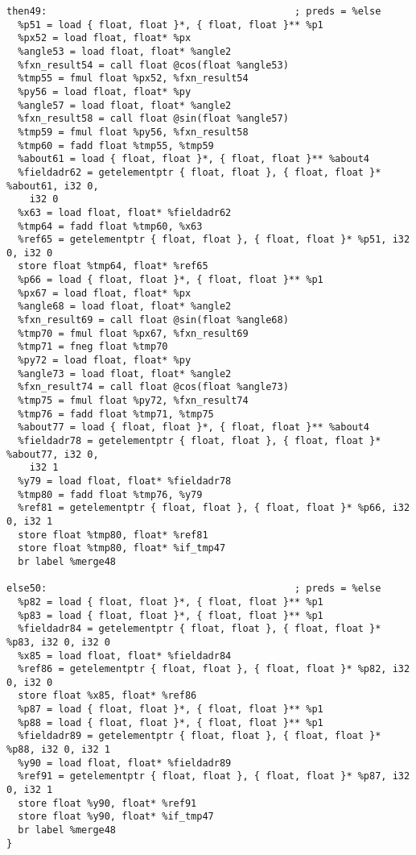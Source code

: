 \documentclass[main.tex]{subfiles}
\begin{document}
{\begin{lstlisting}
then49:                                           ; preds = %else
  %p51 = load { float, float }*, { float, float }** %p1
  %px52 = load float, float* %px
  %angle53 = load float, float* %angle2
  %fxn_result54 = call float @cos(float %angle53)
  %tmp55 = fmul float %px52, %fxn_result54
  %py56 = load float, float* %py
  %angle57 = load float, float* %angle2
  %fxn_result58 = call float @sin(float %angle57)
  %tmp59 = fmul float %py56, %fxn_result58
  %tmp60 = fadd float %tmp55, %tmp59
  %about61 = load { float, float }*, { float, float }** %about4
  %fieldadr62 = getelementptr { float, float }, { float, float }* %about61, i32 0,
    i32 0
  %x63 = load float, float* %fieldadr62
  %tmp64 = fadd float %tmp60, %x63
  %ref65 = getelementptr { float, float }, { float, float }* %p51, i32 0, i32 0
  store float %tmp64, float* %ref65
  %p66 = load { float, float }*, { float, float }** %p1
  %px67 = load float, float* %px
  %angle68 = load float, float* %angle2
  %fxn_result69 = call float @sin(float %angle68)
  %tmp70 = fmul float %px67, %fxn_result69
  %tmp71 = fneg float %tmp70
  %py72 = load float, float* %py
  %angle73 = load float, float* %angle2
  %fxn_result74 = call float @cos(float %angle73)
  %tmp75 = fmul float %py72, %fxn_result74
  %tmp76 = fadd float %tmp71, %tmp75
  %about77 = load { float, float }*, { float, float }** %about4
  %fieldadr78 = getelementptr { float, float }, { float, float }* %about77, i32 0,
    i32 1
  %y79 = load float, float* %fieldadr78
  %tmp80 = fadd float %tmp76, %y79
  %ref81 = getelementptr { float, float }, { float, float }* %p66, i32 0, i32 1
  store float %tmp80, float* %ref81
  store float %tmp80, float* %if_tmp47
  br label %merge48

else50:                                           ; preds = %else
  %p82 = load { float, float }*, { float, float }** %p1
  %p83 = load { float, float }*, { float, float }** %p1
  %fieldadr84 = getelementptr { float, float }, { float, float }* %p83, i32 0, i32 0
  %x85 = load float, float* %fieldadr84
  %ref86 = getelementptr { float, float }, { float, float }* %p82, i32 0, i32 0
  store float %x85, float* %ref86
  %p87 = load { float, float }*, { float, float }** %p1
  %p88 = load { float, float }*, { float, float }** %p1
  %fieldadr89 = getelementptr { float, float }, { float, float }* %p88, i32 0, i32 1
  %y90 = load float, float* %fieldadr89
  %ref91 = getelementptr { float, float }, { float, float }* %p87, i32 0, i32 1
  store float %y90, float* %ref91
  store float %y90, float* %if_tmp47
  br label %merge48
}


\end{lstlisting}}
\end{document}
